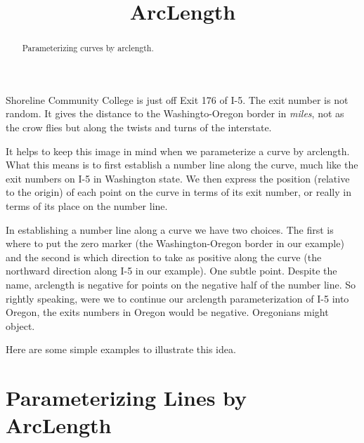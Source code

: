 \documentclass{ximera}
\title{ArcLength}
\begin{document}
\begin{abstract}
Parameterizing curves by arclength. 
\end{abstract}
\maketitle

Shoreline Community College is just off Exit 176 of I-5. The exit number is not random. It gives the distance to the Washingto-Oregon border in \emph{miles}, not as the crow flies but along the twists and turns of the interstate.

It helps to keep this image in mind when we parameterize a curve by arclength. What this means is to first establish a number line along the curve, much like the exit numbers on I-5 in Washington state. We then express the position (relative to the origin) of each point on the curve in terms of its exit number, or really in terms of its place on the number line.

In establishing a number line along a curve we have two choices. The first is where to put the zero marker (the Washington-Oregon border in our example) and the second is which direction to take as positive along the curve (the northward direction along I-5 in our example). One subtle point. Despite the name, arclength is negative for points on the negative half of the number line. So rightly speaking, were we to continue our arclength parameterization of I-5 into Oregon, the exits numbers in Oregon would be negative. Oregonians might object.

Here are some simple examples to illustrate this idea.

\section{Parameterizing Lines by ArcLength}
\end{document}
